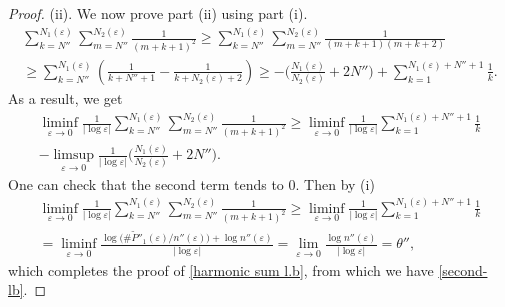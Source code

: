 \documentclass[12pt]{article}
\numberwithin{equation}{section}
\def\e{\varepsilon}
\begin{document}
\begin{proof}
\smallskip
{\rm(ii)}. We now prove part {\rm(ii)} using part {\rm(i)}.
\begin{multline*}
    \sum_{k=N''}^{N_{1}(\varepsilon)}\sum_{m=N''}^{N_{2}(\varepsilon)}\frac{1}{(m+k+1)^2}\ge\sum_{k=N''}^{N_{1}(\varepsilon)}\sum_{m=N''}^{N_{2}(\varepsilon)}\frac{1}{(m+k+1)(m+k+2)}\\\ge\sum_{k=N''}^{N_{1}(\varepsilon)}(\frac{1}{k+N''+1}-\frac{1}{k+N_{2}(\varepsilon)+2})\ge-\Big(\frac{N_{1}(\varepsilon)}{N_{2}(\varepsilon)}+2N''\Big)+\sum_{k=1}^{N_{1}(\varepsilon)+N''+1}\frac{1}{k}.
\end{multline*}
As a result, we get
\begin{align*}
    \liminf_{\varepsilon\to0}\frac{1}{\left|\log{\varepsilon}\right|}\sum_{k=N''}^{N_{1}(\varepsilon)}\sum_{m=N''}^{N_{2}(\varepsilon)}\frac{1}{(m+k+1)^2}\ge\liminf_{\varepsilon\to0}\frac{1}{\left|\log{\varepsilon}\right|}\sum_{k=1}^{N_{1}(\varepsilon)+N''+1}\frac{1}{k}\\-\limsup_{\e\to0}\frac{1}{\left|\log{\varepsilon}\right|}\Big(\frac{N_{1}(\varepsilon)}{N_{2}(\varepsilon)}+2N''\Big).
\end{align*}
One can check that the second term tends to $0$. Then by {\rm(i)} 
\begin{multline*}
    \liminf_{\varepsilon\to0}\frac{1}{\left|\log{\varepsilon}\right|}\sum_{k=N''}^{N_{1}(\varepsilon)}\sum_{m=N''}^{N_{2}(\varepsilon)}\frac{1}{(m+k+1)^2}\ge\liminf_{\varepsilon\to0}\frac{1}{\left|\log{\varepsilon}\right|}\sum_{k=1}^{N_{1}(\varepsilon)+N''+1}\frac{1}{k}\\=\liminf_{\varepsilon\to0}\frac{\log{(\#\widetilde{P}''_{1}(\e)}/n''(\e))+\log{n''(\e)}}{\left|\log{\varepsilon}\right|}=\lim_{\varepsilon\to0}\frac{\log{n''(\varepsilon)}}{\left|\log{\varepsilon}\right|}=\theta'',
\end{multline*}
which completes the proof of \eqref{harmonic sum l.b}, from which we have \eqref{second-lb}. 


\end{proof}
\end{document}
